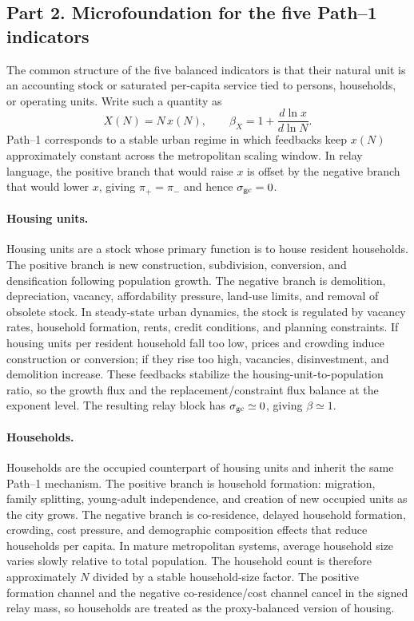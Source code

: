 \subsection*{Part 2. Microfoundation for the five Path--1 indicators}

The common structure of the five balanced indicators is that their natural unit is an accounting stock or saturated per-capita service tied to persons, households, or operating units. Write such a quantity as
\[
X(N)=N\,x(N),\qquad \beta_X=1+\frac{d\ln x}{d\ln N}.
\]
Path--1 corresponds to a stable urban regime in which feedbacks keep \(x(N)\) approximately constant across the metropolitan scaling window. In relay language, the positive branch that would raise \(x\) is offset by the negative branch that would lower \(x\), giving \(\pi_+=\pi_-\) and hence \(\sigma_{\rm gc}=0\).

\paragraph{Housing units.}
Housing units are a stock whose primary function is to house resident households. The positive branch is new construction, subdivision, conversion, and densification following population growth. The negative branch is demolition, depreciation, vacancy, affordability pressure, land-use limits, and removal of obsolete stock. In steady-state urban dynamics, the stock is regulated by vacancy rates, household formation, rents, credit conditions, and planning constraints. If housing units per resident household fall too low, prices and crowding induce construction or conversion; if they rise too high, vacancies, disinvestment, and demolition increase. These feedbacks stabilize the housing-unit-to-population ratio, so the growth flux and the replacement/constraint flux balance at the exponent level. The resulting relay block has \(\sigma_{\rm gc}\simeq 0\), giving \(\beta\simeq 1\).

\paragraph{Households.}
Households are the occupied counterpart of housing units and inherit the same Path--1 mechanism. The positive branch is household formation: migration, family splitting, young-adult independence, and creation of new occupied units as the city grows. The negative branch is co-residence, delayed household formation, crowding, cost pressure, and demographic composition effects that reduce households per capita. In mature metropolitan systems, average household size varies slowly relative to total population. The household count is therefore approximately \(N\) divided by a stable household-size factor. The positive formation channel and the negative co-residence/cost channel cancel in the signed relay mass, so households are treated as the proxy-balanced version of housing.


